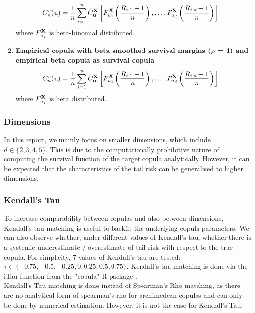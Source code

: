 \documentclass[12pt]{report}
\newcommand{\1}{\mathbf{1}}
\begin{document}
\begin{flushleft}
\begin{enumerate}
\begin{align*}
C_{n}^{v}(\textbf{u}) &= \frac{1}{n} \sum\limits_{i = 1}^{n} \Tilde{C}_{\textbf{u}}^{\textbf{X}} \left[\Bar{F}_{u_{1}}^{\textbf{X}}\left(\frac{R_{i,1} - 1}{n}\right), \dots, \Bar{F}_{u_{d}}^{\textbf{X}}\left(\frac{R_{i,d} - 1}{n}\right) \right]
\end{align*}
where $\Bar{F}_{u_{j}}^{\textbf{X}}$ is beta-binomial distributed.
\item \textbf{Empirical copula with beta smoothed survival margins ($\rho$ = 4) and empirical beta copula as survival copula}
\begin{align*}
C_{n}^{v}(\textbf{u}) &= \frac{1}{n} \sum\limits_{i = 1}^{n} \Tilde{C}_{\textbf{u}}^{\textbf{X}} \left[\Bar{F}_{u_{1}}^{\textbf{X}}\left(\frac{R_{i,1} - 1}{n}\right), \dots, \Bar{F}_{u_{d}}^{\textbf{X}}\left(\frac{R_{i,d} - 1}{n}\right) \right]
\end{align*}
where $\Bar{F}_{u_{j}}^{\textbf{X}}$ is beta distributed.
\end{enumerate}

\subsubsection{Dimensions}

In this report, we mainly focus on smaller dimensions, which include $d \in \{ 2, 3, 4, 5 \}$. This is due to the computationally prohibitive nature of computing the survival function of the target copula analytically. However, it can be expected that the characteristics of the tail risk can be generalised to higher dimensions.

\subsubsection{Kendall's Tau}
To increase comparability between copulas and also between dimensions, Kendall's tau matching is useful to backfit the underlying copula parameters. We can also observe whether, under different values of Kendall's tau, whether there is a systemic underestimate / overestimate of tail risk with respect to the true copula. For simplicity, 7 values of Kendall's tau are tested: $\tau \in \{ -0.75, -0.5, -0.25, 0, 0.25, 0.5, 0.75 \}$. Kendall's tau matching is done via the iTau function from the "copula" R package \parencite{copulaRPackage2023}. \\
\vspace{0.5cm}
Kendall's Tau matching is done instead of Spearman's Rho matching, as there are no analytical form of spearman's rho for archimedean copulas and can only be done by numerical estimation. However, it is not the case for Kendall's Tau.


\end{flushleft}
\end{document}
